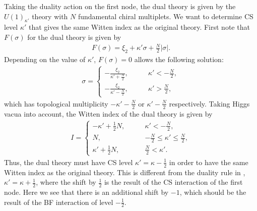 \documentclass[a4paper,11pt]{article}
\begin{document}
Taking the duality action on the first node, the dual theory is given by the $U(1)_{\kappa'}$ theory with $N$ fundamental chiral multiplets. We want to determine CS level $\kappa'$ that gives the same Witten index as the original theory. First note that $F(\sigma)$ for the dual theory is given by
\begin{align}
F(\sigma) = \xi_2+\kappa' \sigma+\frac{N}{2} |\sigma|.
\end{align}
Depending on the value of $\kappa'$, $F(\sigma) = 0$ allows the following solution:
\begin{align}
\sigma = \left\{\begin{array}{cc}
-\frac{\xi_2}{\kappa'+\frac{N}{2}}, \qquad & \kappa' < -\frac{N}{2}, \\
-\frac{\xi_2}{\kappa'-\frac{N}{2}}, \qquad & \kappa' > \frac{N}{2},
\end{array}\right.
\end{align}
which has topological multiplicity $-\kappa'-\frac{N}{2}$ or $\kappa'-\frac{N}{2}$ respectively. Taking Higgs vacua into account, the Witten index of the dual theory is given by
\begin{align}
I = \left\{\begin{array}{cc}
-\kappa'+\frac{1}{2} N, \qquad & \kappa' < -\frac{N}{2}, \\
N, \qquad & -\frac{N}{2} \leq \kappa' \leq \frac{N}{2}, \\
\kappa'+\frac{1}{2} N, \qquad & \frac{N}{2} < \kappa'.
\end{array}\right.
\end{align}
Thus, the dual theory must have CS level $\kappa' = \kappa-\frac{1}{2}$ in order to have the same Witten index as the original theory. This is different from the duality rule in \cite{Benini:2011mf}, $\kappa' = \kappa+\frac{1}{2}$, where the shift by $\frac{1}{2}$ is the result of the CS interaction of the first node. Here we see that there is an additional shift by $-1$, which should be the result of the BF interaction of level $-\frac{1}{2}$.
\end{document}
